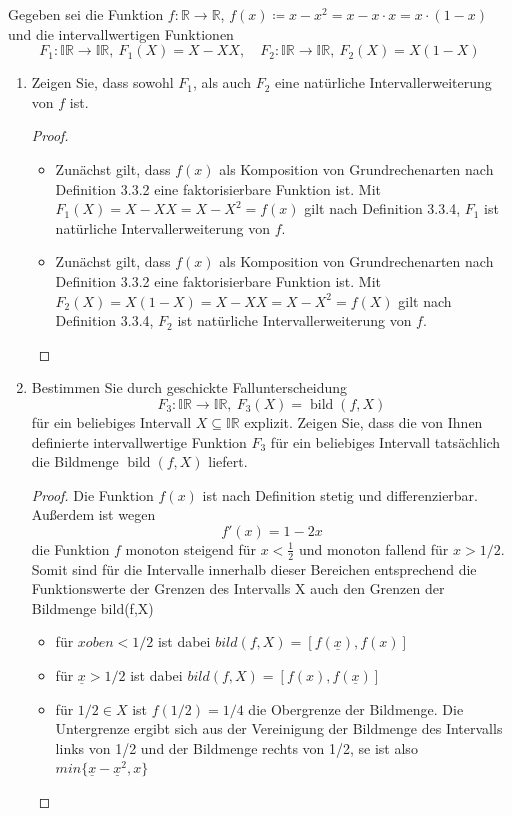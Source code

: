 \documentclass[12pt]{extreport} %
\newcommand{\R}{\mathbb{R}}
\theoremstyle{named}
\theoremstyle{nnamed}
\theoremstyle{itshape}
\theoremstyle{normal}
\begin{document}
Gegeben sei die Funktion $f \colon \R \rightarrow \R$, $f(x) \coloneqq x - x^2 = x - x \cdot x = x \cdot \left( 1 - x \right)$ und die intervallwertigen Funktionen
	$$ F_1 \colon \mathbb{IR} \rightarrow \mathbb{IR}, ~ F_1(X) = X - X X, \quad F_2 \colon \mathbb{IR} \rightarrow \mathbb{IR}, ~ F_2(X) = X(1- X) $$
\begin{enumerate}
	\item Zeigen Sie, dass sowohl $F_1$, als auch $F_2$ eine natürliche Intervallerweiterung von $f$ ist.
		\begin{proof} ~\
			\begin{itemize}
				\item Zunächst gilt, dass $f(x)$ als Komposition von Grundrechenarten nach Definition 3.3.2 eine faktorisierbare Funktion ist. Mit $F_1(X)=X-XX=X-X^2=f(x)$ gilt nach Definition 3.3.4, $F_1$ ist natürliche Intervallerweiterung von $f$.
				\item Zunächst gilt, dass $f(x)$ als Komposition von Grundrechenarten nach Definition 3.3.2 eine faktorisierbare Funktion ist. Mit $F_2(X)=X(1-X)=X-XX=X-X^2=f(X)$ gilt nach Definition 3.3.4, $F_2$ ist natürliche Intervallerweiterung von $f$.
			\end{itemize}
		\end{proof}
	\item Bestimmen Sie durch geschickte Fallunterscheidung
		$$ F_3 \colon \mathbb{IR} \rightarrow \mathbb{IR}, ~ F_3(X) = \operatorname{bild}(f, X) $$
		für ein beliebiges Intervall $X \subseteq \mathbb{IR}$ explizit. Zeigen Sie, dass die von Ihnen definierte intervallwertige Funktion $F_3$ für ein beliebiges Intervall tatsächlich die Bildmenge $\operatorname{bild}(f, X)$ liefert.
		\begin{proof}
			Die Funktion $f(x)$ ist nach Definition stetig und differenzierbar. Außerdem ist wegen 
					$$f'(x)=1-2x$$ 
					die Funktion $f$ monoton steigend für $x<\frac{1}{2}$ und monoton fallend für $x>1/2$. Somit sind für die Intervalle innerhalb dieser Bereichen entsprechend die Funktionswerte der Grenzen des Intervalls X auch den Grenzen der Bildmenge bild(f,X)
					\begin{itemize}
						\item  für $xoben < 1/2$ ist dabei $bild(f,X) =[f(\underline{x}), f(x)]$
						\item für $\underline{x} >1/2$ ist dabei $bild(f,X) =[f(x), f(\underline{x})]$
						\item für $1/2 \in X$ ist $f(1/2)=1/4$ die Obergrenze der Bildmenge. Die Untergrenze ergibt sich aus der Vereinigung der Bildmenge des Intervalls links von 1/2 und der Bildmenge rechts von 1/2, se ist also $min\{\underline{x} - \underline{x}^2, x\}$

\end{itemize}
\end{proof}
\end{enumerate}
\end{document}
